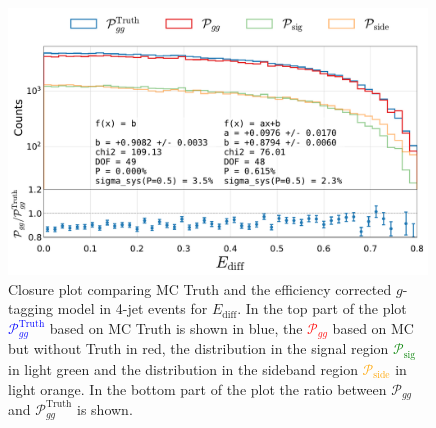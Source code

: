 \begin{figure}
  \centerfloat
  \includegraphics[width=0.99\textwidth, trim=10 0 20 5, clip, page=1]{figures/quarks/gtag-closure_test-down_sample=1.00-ML_vars=vertex-selection=b-ejet_min=4-n_iter_RS_lgb=99-n_iter_RS_xgb=9-cdot_cut=0.90-version=19-njet=4.pdf}
  \caption[Closure Plot Comparing MC Truth and the Efficiency Corrected $g$-Tagging Model in 4-Jet Events for $E_\mathrm{diff}$]
          {Closure plot comparing MC Truth and the efficiency corrected $g$-tagging model in 4-jet events for $E_\mathrm{diff}$. In the top part of the plot \textcolor{blue}{$\mathcal{P}_{gg}^\mathrm{Truth}$} based on MC Truth is shown in blue, the \textcolor{red}{$\mathcal{P}_{gg}$} based on MC but without Truth in red, the distribution in the signal region \textcolor{green}{$\mathcal{P}_{\mathrm{sig}}$} in light green and the distribution in the sideband region \textcolor{orange}{$\mathcal{P}_{\mathrm{side}}$} in light orange. In the bottom part of the plot the ratio between $\mathcal{P}_{gg}$ and $\mathcal{P}_{gg}^\mathrm{Truth}$  is shown. } 
  \label{fig:q:closure_E_diff}
\end{figure}
